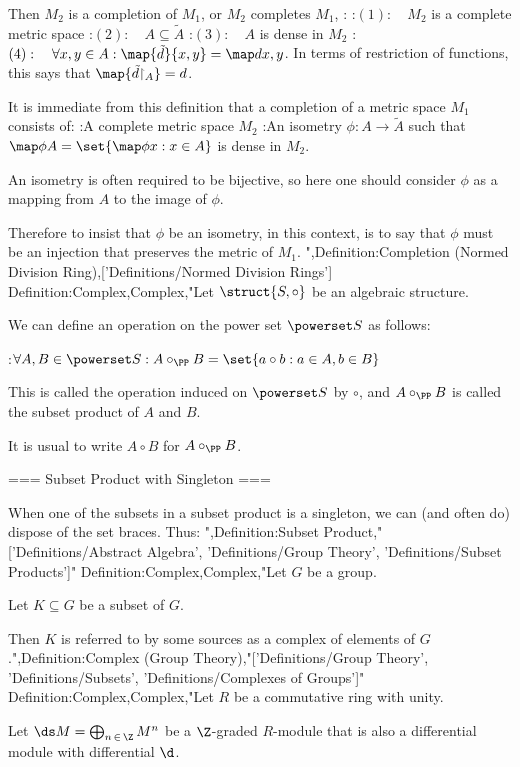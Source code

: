 Then $M_2$ is a completion of $M_1$, or $M_2$ completes $M_1$, :
:$(1): \quad M_2$ is a complete metric space
:$(2): \quad A \subseteq \tilde A$
:$(3): \quad A$ is dense in $M_2$
:$(4): \quad \forall x, y \in A : \map {\tilde d} {x, y} = \map d {x, y}$. In terms of restriction of functions, this says that $\map {\tilde d {\restriction_A} } = d$.


It is immediate from this definition that a completion of a metric space $M_1$ consists of:
:A complete metric space $M_2$
:An isometry $\phi : A \to \tilde A$
such that $\map \phi A = \set {\map \phi x: x \in A}$ is dense in $M_2$.

An isometry is often required to be bijective, so here one should consider $\phi$ as a mapping from $A$ to the image of $\phi$.

Therefore to insist that $\phi$ be an isometry, in this context, is to say that $\phi$ must be an injection that preserves the metric of $M_1$.
",Definition:Completion (Normed Division Ring),['Definitions/Normed Division Rings']
Definition:Complex,Complex,"Let $\struct {S, \circ}$ be an algebraic structure.


We can define an operation on the power set $\powerset S$ as follows:

:$\forall A, B \in \powerset S: A \circ_\PP B = \set {a \circ b: a \in A, b \in B}$


This is called the operation induced on $\powerset S$ by $\circ$, and $A \circ_\PP B$ is called the subset product of $A$ and $B$.


It is usual to write $A \circ B$ for $A \circ_\PP B$.


=== Subset Product with Singleton ===

When one of the subsets in a subset product is a singleton, we can (and often do) dispose of the set braces. Thus:
",Definition:Subset Product,"['Definitions/Abstract Algebra', 'Definitions/Group Theory', 'Definitions/Subset Products']"
Definition:Complex,Complex,"Let $G$ be a group.

Let $K \subseteq G$ be a subset of $G$.


Then $K$ is referred to by some sources as a complex of elements of $G$.",Definition:Complex (Group Theory),"['Definitions/Group Theory', 'Definitions/Subsets', 'Definitions/Complexes of Groups']"
Definition:Complex,Complex,"Let $R$ be a commutative ring with unity.

Let $\ds M = \bigoplus_{n \mathop \in \Z} M^n$ be a $\Z$-graded $R$-module that is also a differential module with differential $\d$.



